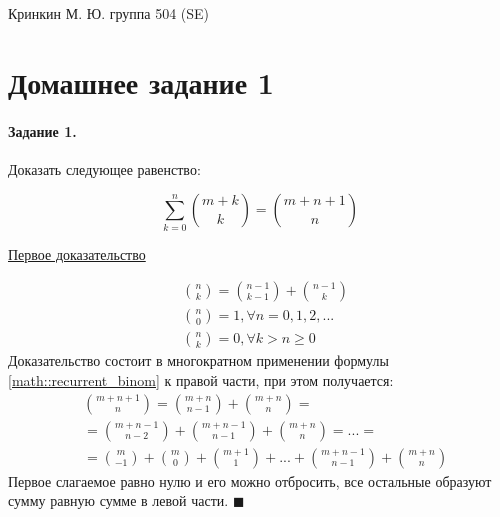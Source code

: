 \documentclass[a4paper,12pt]{article}
\begin{document}
\sloppy

\lstset{
	basicstyle=\small,
	stringstyle=\ttfamily,
	showstringspaces=false,
	columns=fixed,
	breaklines=true,
	numbers=right,
	numberstyle=\tiny
}

\newtheorem{Def}{Определение}[section]
\newtheorem{Th}{Теорема}
\newtheorem{Lem}[Th]{Лемма}
\newenvironment{Proof}
	{\par\noindent{\bf Доказательство.}}
	{\hfill$\scriptstyle\blacksquare$}
\newenvironment{Solution}
	{\par\noindent{\bf Решение.}}
	{\hfill$\scriptstyle\blacksquare$}


\begin{flushright}
	Кринкин М. Ю. группа 504 (SE)
\end{flushright}

\section{Домашнее задание 1}

\paragraph{Задание 1.} Доказать следующее равенство:

\begin{equation}
	\sum_{k=0}^n \binom{m+k}{k} = \binom{m+n+1}{n}
\end{equation}

\underline{Первое доказательство}

\begin{Proof}
	\begin{equation}
		\begin{split}
			& \binom{n}{k} = \binom{n-1}{k-1} + \binom{n-1}{k} \\
			& \binom{n}{0} = 1, \forall n = 0, 1, 2, ... \\
			& \binom{n}{k} = 0, \forall k > n \ge 0
		\end{split}
		\label{math::recurrent_binom}
	\end{equation}
	Доказательство состоит в многократном применении формулы \ref{math::recurrent_binom} к правой части, при этом получается:
	\[
		\begin{split}
			& \binom{m+n+1}{n} = \binom{m+n}{n-1} + \binom{m+n}{n} = \\ 
			& = \binom{m+n-1}{n-2} + \binom{m+n-1}{n-1} + \binom{m+n}{n} = ... = \\
			& = \binom{m}{-1} + \binom{m}{0} + \binom{m+1}{1} + ... + \binom{m+n-1}{n-1} + \binom{m+n}{n}
		\end{split}
	\]
	Первое слагаемое равно нулю и его можно отбросить, все остальные образуют сумму равную сумме в левой части.
\end{Proof}
\par\bigskip
\end{document}
